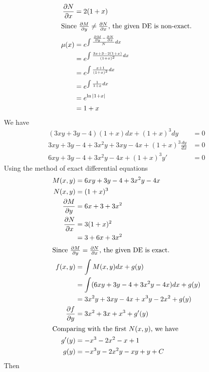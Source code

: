 \documentclass{zc-ust-hw}
\begin{document}
\begin{enumerate}
\begin{enumerate}
\begin{sol}
\begin{align}
            \frac{\partial N}{\partial x}&=2(1+x)\\
            \intertext{Since $\frac{\partial M}{\partial y}\neq\frac{\partial
            N}{\partial x}$, the given DE is non-exact.}
            \mu(x)&=e^{\int \frac{\frac{\partial M}{\partial y}-\frac{\partial
            N}{\partial x}}{N} dx}\\
                  &=e^{\int \frac{3x+3-2(1+x)}{(1+x)^2} dx}\\
                  &=e^{\int \frac{x+1}{(1+x)^2} dx}\\
                  &=e^{\int \frac{1}{1+x} dx}\\
                  &=e^{\ln |1+x|}\\
                  &=1+x
          \end{align}
          We have
          \begin{align}
            (3xy+3y-4)(1+x)dx+(1+x)^3dy&=0\\
            3xy+3y-4+3x^2y+3xy-4x+(1+x)^3 \frac{dy}{dx}&=0\\
            6xy+3y-4+3x^2y-4x + (1+x)^3 y'&=0
          \end{align}
          Using the method of exact differential equations
          \begin{align}
            M(x,y)&=6xy+3y-4+3x^2y-4x\\
            N(x,y)&=(1+x)^3\\
            \frac{\partial M}{\partial y}&=6x+3+3x^2\\
            \frac{\partial N}{\partial x}&=3(1+x)^2\\
                                         &=3+6x+3x^2\\
            \intertext{Since $\frac{\partial M}{\partial y}=\frac{\partial
            N}{\partial x}$, the given DE is exact.}
            f(x,y)&=\int M(x,y) dx + g(y)\\
                  &=\int (6xy+3y-4+3x^2y-4x) dx + g(y)\\
                  &=3x^2y+3xy-4x+x^3y-2x^2+g(y)\\
            \frac{\partial f}{\partial y}&=3x^2+3x+x^3+g'(y)\\
            \intertext{Comparing with the first $N(x,y)$, we have}
            g'(y)&=-x^3 -2x^2-x+1\\
            g(y)&=-x^3y-2x^2y-xy+y+C\\
          \end{align}
          Then
          \begin{align}

\end{align}
\end{sol}
\end{enumerate}
\end{enumerate}
\end{document}
